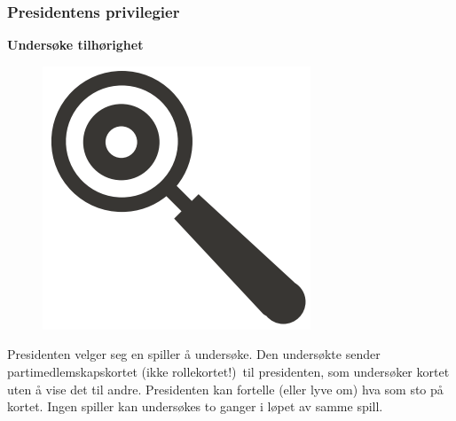 \documentclass[a4paper, 10pt, twocolumn, twoside]{article}
\begin{document}
\subsubsection{Presidentens privilegier}

\textbf{Undersøke tilhørighet}\\
\begin{figure}
\includegraphics[width=\linewidth]{./graphics/hitler_glass}
\end{figure}
Presidenten velger seg en spiller å undersøke. Den undersøkte sender partimedlemskaps\-kortet (ikke rollekortet!)\ til presidenten, som undersøker kortet uten å vise det til andre. Presidenten kan fortelle (eller lyve om) hva som sto på kortet. Ingen spiller kan undersøkes to ganger i løpet av samme spill.
\end{document}

